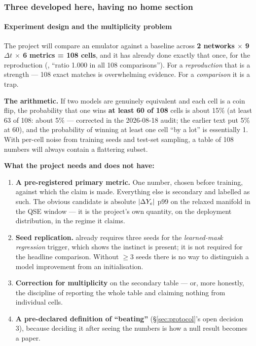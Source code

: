 \subsubsection{Three developed here, having no home section}
\label{sec:threedeveloped}

\paragraph{Experiment design and the multiplicity problem}
\label{sec:multiplicity}

The project will compare an emulator against a baseline across
\textbf{2 networks $\times$ 9 $\Delta t$ $\times$ 6 metrics = 108 cells}, and
it has already done exactly that once, for the reproduction
(, ``ratio 1.000 in all 108 comparisons''). For a
\emph{reproduction} that is a strength --- 108 exact matches is overwhelming
evidence. For a \emph{comparison} it is a trap.

\textbf{The arithmetic.} If two models are genuinely equivalent and each cell is
a coin flip, the probability that one wins \textbf{at least 60 of 108} cells is
about 15\% (at least 63 of 108: about 5\% --- corrected in the 2026-08-18 audit;
the earlier text put 5\% at 60), and the probability of winning at least one
cell ``by a lot'' is essentially 1. With per-cell noise from training seeds and
test-set sampling, a table of 108 numbers will always contain a flattering
subset. \derivedhere[binomial]

\textbf{What the project needs and does not have:}

\begin{enumerate}
\item \textbf{A pre-registered primary metric.} One number, chosen before
  training, against which the claim is made. Everything else is secondary and
  labelled as such. The obvious candidate is absolute $|\Delta Y_{e}|$ p99 on the
  relaxed manifold in the QSE window --- it is the project's own quantity, on
  the deployment distribution, in the regime it claims.
\item \textbf{Seed replication.}  already requires three seeds
  for the \emph{learned-mask regression} trigger, which shows the instinct is
  present; it is not required for the headline comparison. Without $\ge 3$
  seeds there is no way to distinguish a model improvement from an
  initialisation.
\item \textbf{Correction for multiplicity} on the secondary table --- or, more
  honestly, the discipline of reporting the whole table and claiming nothing
  from individual cells.
\item \textbf{A pre-declared definition of ``beating''}
  (\S\ref{sec:protocol}'s open decision 3), because deciding it after seeing the
  numbers is how a null result becomes a paper.
\end{enumerate}

